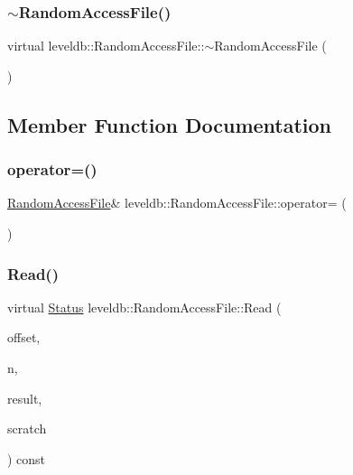 \subsubsection{\texorpdfstring{$\sim$RandomAccessFile()}{~RandomAccessFile()}}
{\footnotesize\ttfamily virtual leveldb\+::\+Random\+Access\+File\+::$\sim$\+Random\+Access\+File (\begin{DoxyParamCaption}{ }\end{DoxyParamCaption})\hspace{0.3cm}{\ttfamily [virtual]}}



\subsection{Member Function Documentation}
\mbox{\label{classleveldb_1_1_random_access_file_ad76fdf4e12b84592a7ac31a3b57a7377}} 
\subsubsection{\texorpdfstring{operator=()}{operator=()}}
{\footnotesize\ttfamily \mbox{\hyperlink{classleveldb_1_1_random_access_file}{Random\+Access\+File}}\& leveldb\+::\+Random\+Access\+File\+::operator= (\begin{DoxyParamCaption}\item[{const \mbox{\hyperlink{classleveldb_1_1_random_access_file}{Random\+Access\+File}} \&}]{ }\end{DoxyParamCaption})\hspace{0.3cm}{\ttfamily [delete]}}

\mbox{\label{classleveldb_1_1_random_access_file_a1a09fadcec904d9791a968acabca98d0}} 
\subsubsection{\texorpdfstring{Read()}{Read()}}
{\footnotesize\ttfamily virtual \mbox{\hyperlink{classleveldb_1_1_status}{Status}} leveldb\+::\+Random\+Access\+File\+::\+Read (\begin{DoxyParamCaption}\item[{uint64\+\_\+t}]{offset,  }\item[{size\+\_\+t}]{n,  }\item[{\mbox{\hyperlink{classleveldb_1_1_slice}{Slice}} $\ast$}]{result,  }\item[{char $\ast$}]{scratch }\end{DoxyParamCaption}) const\hspace{0.3cm}{\ttfamily [pure virtual]}}

